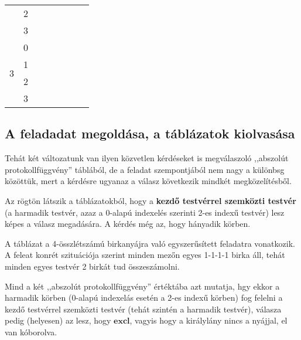 \documentclass{article}
\newcommand{\blk}{\cellcolor{darkgray}}
\newcommand{\red}{\cellcolor{red!33}}
\newcommand{\grn}{\cellcolor{green!33}}
\newcommand{\just}[1]{\boxed{#1}}%
\newcommand{\incl}{\mathbf{incl}}
\newcommand{\excl}{\mathbf{excl}}
\begin{document}
\begin{table}[H]
\begin{tabular}{c|c|c|c|c|c|c|c|}
				               &  2                        &    \blk           & \blk           & \red\just\excl & \grn\just\incl & \blk           & \blk           \\\cline{2-8}
				               &  3                        &    \blk           & \blk           & \red\just\excl & \grn\just\incl & \blk           & \blk           \\\hline\hline
			\multirow{4}{*}{3}     &  0                        &    \blk           & \blk           & \blk           & \blk           & \blk           & \blk           \\\cline{2-8}
				               &  1                        &    \blk           & \blk           & \blk           & \blk           & \blk           & \blk           \\\cline{2-8}
				               &  2                        &    \blk           & \blk           & \blk           & \blk           & \blk           & \blk           \\\cline{2-8}
				               &  3                        &    \blk           & \blk           & \blk           & \blk           & \blk           & \blk           \\\hline
		\end{tabular}
	\end{table}

	\subsection{A feladadat megoldása, a táblázatok kiolvasása}

	Tehát két változatunk van ilyen közvetlen kérdéseket is megválaszoló ,,abszolút protokollfüggvény'' táblából, de a feladat szempontjából nem nagy a különbsg közöttük, mert a kérdésre ugyanaz a válasz következik mindkét megközelítésből.

	Az rögtön látszik a táblázatokból, hogy a \textbf{kezdő testvérrel szemközti testvér} (a harmadik testvér, azaz a 0-alapú indexelés szerinti 2-es indexű testvér) lesz képes a válasz megadására. A kérdés még az, hogy hányadik körben.

	A táblázat a 4-összlétszámú birkanyájra való egyszerűsített feladatra vonatkozik. A feleat konrét szituációja szerint minden mezőn egyes 1-1-1-1 birka áll, tehát minden egyes testvér 2 birkát tud összeszámolni.

	Mind a két ,,abszolút protokollfüggvény'' értéktába azt mutatja, hgy ekkor a harmadik körben (0-alapú indexelás esetén a 2-es indexű körben) fog felelni a kezdő testvérrel szemközti testvér (tehát szintén a harmadik testvér), válasza pedig (helyesen) az lesz, hogy $\just\excl$, vagyis hogy a királylány nincs a nyájjal, el van kóborolva.
\end{document}
